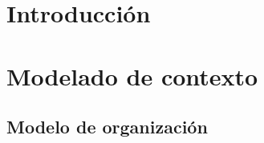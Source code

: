 \documentclass[a4paper,11pt]{article}
\begin{document}
	\newpage
	\tableofcontents
	\newpage
	\section{Introducción}
	\newpage
	\section{Modelado de contexto}
		\subsection{Modelo de organización}
\end{document}
